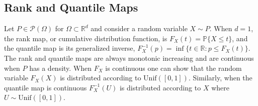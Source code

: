 \documentclass{article}
\theoremstyle{definition}
\begin{document}
\subsection{Rank and Quantile Maps}
Let $P\in \mathcal{P}(\Omega)$ for $\Omega \subset \mathbb{R}^d$ and consider a random variable $X \sim P$.  When $d=1$, the rank map, or cumulative distribution function, is $F_X(t) = \mathbb{P}\{X \leq t\} $, and the quantile map is its generalized inverse, $F_X^{-1}(p) =\inf \{t\in \mathbb R: p\leq F_X(t)\}$. The rank and quantile maps are always monotonic increasing and are continuous when $P$ has a density. When $F_X$ is continuous one can show that the random variable $F_X(X)$ is distributed according to $\text{Unif}([0, 1])$. Similarly, when the quantile map is continuous $F_X^{-1}(U)$ is distributed according to $X$ where $ U \sim \text{Unif}([0, 1])$.
\end{document}
